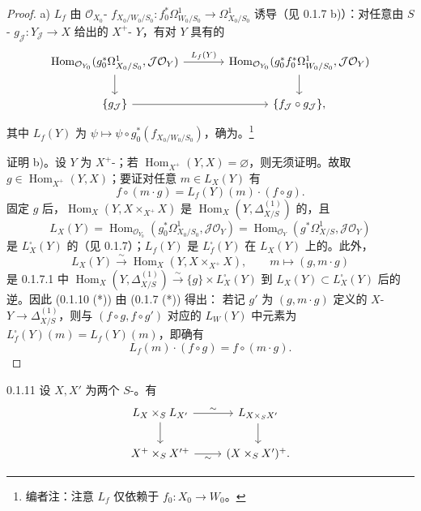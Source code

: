 \begin{proof}
a) $L_f$ 由 $\mathcal O_{X_0}$- $f_{X_0/W_0/S_0}:f_0^*\Omega^1_{W_0/S_0}\to\Omega^1_{X_0/S_0}$ 诱导（见 0.1.7 b)）：对任意由 $S$- $g_{\mathcal J}:Y_{\mathcal J}\to X$ 给出的 $X^+$- $Y$，有对 $Y$ 具有的
\[\begin{tikzcd}[column sep=large]
\operatorname{Hom}_{\mathcal O_{Y_0}}(g_0^*\Omega^1_{X_0/S_0},\mathcal J\mathcal O_Y)\arrow[r,"L_f(Y)"]\arrow[d]&\operatorname{Hom}_{\mathcal O_{Y_0}}(g_0^*f_0^*\Omega^1_{W_0/S_0},\mathcal J\mathcal O_Y)\arrow[d]\\
\{g_{\mathcal J}\}\arrow[r]&\{f_{\mathcal J}\circ g_{\mathcal J}\},
\end{tikzcd}\]
其中 $L_f(Y)$ 为 $\psi\mapsto\psi\circ g_0^*(f_{X_0/W_0/S_0})$，确为。\footnote{编者注：注意 $L_f$ 仅依赖于 $f_0:X_0\to W_0$。}

证明 b)。设 $Y$ 为 $X^+$-；若 $\operatorname{Hom}_{X^+}(Y,X)=\varnothing$，则无须证明。故取 $g\in\operatorname{Hom}_{X^+}(Y,X)$；要证对任意 $m\in L_X(Y)$ 有
\[f\circ(m\cdot g)=L_f(Y)(m)\cdot(f\circ g).\tag{0.1.10 (*)}\]
固定 $g$ 后，$\operatorname{Hom}_X(Y,X\times_{X^+}X)$ 是 $\operatorname{Hom}_X(Y,\Delta^{(1)}_{X/S})$ 的，且
\[L_X(Y)=\operatorname{Hom}_{\mathcal O_{Y_0}}(g_0^*\Omega^1_{X_0/S_0},\mathcal J\mathcal O_Y)=\operatorname{Hom}_{\mathcal O_Y}(g^*\Omega^1_{X/S},\mathcal J\mathcal O_Y)\]
是 $L_X^{\square}(Y)$ 的（见 0.1.7）；$L_f(Y)$ 是 $L_f^{\square}(Y)$ 在 $L_X(Y)$ 上的。此外，
\[L_X(Y)\xrightarrow{\sim}\operatorname{Hom}_X(Y,X\times_{X^+}X),\qquad m\mapsto(g,m\cdot g)\]
是 0.1.7.1 中 $\operatorname{Hom}_X(Y,\Delta^{(1)}_{X/S})\xrightarrow{\sim}\{g\}\times L_X^{\square}(Y)$ 到 $L_X(Y)\subset L_X^{\square}(Y)$ 后的逆。因此 (0.1.10 (*)) 由 (0.1.7 (*)) 得出：
若记 $g'$ 为 $(g,m\cdot g)$ 定义的 $X$- $Y\to\Delta^{(1)}_{X/S}$，则与 $(f\circ g,f\circ g')$ 对应的 $L_W(Y)$ 中元素为 $L_f^{\square}(Y)(m)=L_f(Y)(m)$，即确有
\[L_f(m)\cdot(f\circ g)=f\circ(m\cdot g).\]
\end{proof}
\begin{SGAresult}{}{0.1.11}
设 $X,X'$ 为两个 $S$-。有
\[\begin{tikzcd}L_X\times_S L_{X'}\arrow[r,"\sim"]\arrow[d]&L_{X\times_S X'}\arrow[d]\\X^+\times_S X'^+\arrow[r,"\sim"']&(X\times_S X')^+.\end{tikzcd}\]
\end{SGAresult}

